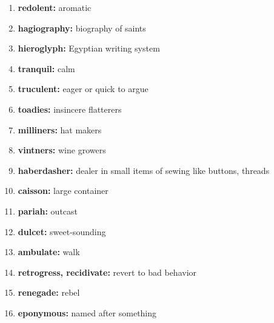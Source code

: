 \documentclass{article}
\begin{document}
\begin{enumerate}
    \item \textbf{redolent: }{aromatic}
    \item \textbf{hagiography: }{biography of saints}
    \item \textbf{hieroglyph: }{Egyptian writing system}
    \item \textbf{tranquil: }{calm}
    \item \textbf{truculent: }{eager or quick to argue}
    \item \textbf{toadies: }{insincere flatterers}
    \item \textbf{milliners: }{hat makers}
    \item \textbf{vintners: }{wine growers}
    \item \textbf{haberdasher: }{dealer in small items of sewing like buttons, threads}
    \item \textbf{caisson: }{large container}
    \item \textbf{pariah: }{outcast}
    \item \textbf{dulcet: }{sweet-sounding}
    \item \textbf{ambulate: }{walk}
    \item \textbf{retrogress, recidivate: }{revert to bad behavior}
    \item \textbf{renegade: }{rebel}
    \item \textbf{eponymous: }{named after something}
    
\end{enumerate}
\end{document}
